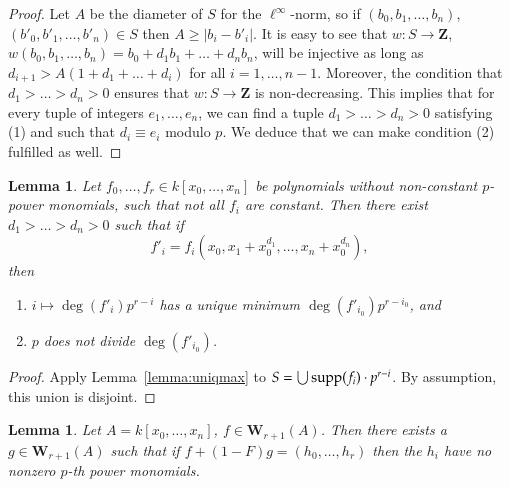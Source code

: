\documentclass[twoside]{amsart}
\newcommand{\WW}{\mathbf{W}}
\newcommand{\ZZ}{\mathbf{Z}}
\renewcommand{\to}{\longrightarrow}
\theoremstyle{plain}
\newtheorem{lemma}[subsubsection]{Lemma}
\theoremstyle{definition}
\theoremstyle{remark}
\numberwithin{equation}{subsection}
\begin{document}
\begin{proof}
Let $A$ be the diameter of $S$ for the $\ell^\infty$-norm, so if $(b_0, b_1, \ldots, b_n)$, $(b'_0, b'_1, \ldots, b'_n) \in S$ then $A \geq |b_i-b'_i|$. It is easy to see that $w\colon S\to \ZZ$, $w(b_0, b_1, \ldots, b_n) = b_0 + d_1 b_1 + \ldots + d_n b_n$, will be injective as long as $d_{i+1} > A(1 + d_1 + \ldots + d_i)$ for all $i=1, \ldots, n-1$. Moreover, the condition that $d_1>\ldots>d_n>0$ ensures that $w\colon S\to \ZZ$ is non-decreasing. This implies that for every tuple of integers $e_1, \ldots, e_n$, we can find a tuple $d_1> \ldots > d_n > 0$ satisfying (1) and such that $d_i \equiv e_i$ modulo $p$. We deduce that we can make condition (2) fulfilled as well.
\end{proof}

\begin{lemma} \label{lemma:finddi}
	Let $f_0, \ldots, f_{r} \in k[x_0, \ldots, x_n]$ be polynomials without non-constant $p$-power monomials, such that not all $f_i$ are constant. Then there exist $d_1 >  \ldots > d_n>0$ such that if 
	\[ 
		f'_i = f_i(x_0, x_1 + x_0^{d_1}, \ldots, x_{n} + x_0^{d_{n}}), 
	\]
	then 
	\begin{enumerate}[(1)]
		\item $i\mapsto \deg(f'_i)p^{r-i}$ has a unique minimum $\deg(f'_{i_0})p^{r-i_0}$, and 
		\item $p$ does not divide $\deg(f'_{i_0})$.
	\end{enumerate}
\end{lemma}

\begin{proof}
Apply Lemma~\ref{lemma:uniqmax} to $S = \bigcup {\rm supp}(f_i)\cdot p^{r-i}$. By assumption, this union is disjoint.
\end{proof}

\begin{lemma} \label{lemma:noppower}
	Let $A=k[x_0, \ldots, x_n]$, $f\in \WW_{r+1}(A)$. Then there exists a $g\in \WW_{r+1}(A)$ such that if $f + (1-F)g = (h_0, \ldots, h_{r})$ then the $h_i$ have no nonzero $p$-th power monomials.
\end{lemma}
\end{document}
